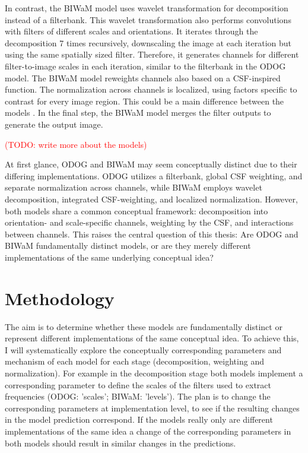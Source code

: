In contrast, the BIWaM model uses wavelet transformation for decomposition instead of a
filterbank. This wavelet transformation also performs convolutions with filters of
different scales and orientations. It iterates through the decomposition 7 times
recursively, downscaling the image at each iteration but using the same spatially sized
filter. Therefore, it generates channels for different filter-to-image scales in each
iteration, similar to the filterbank in the ODOG model. The BIWaM model reweights channels
also based on a CSF-inspired function. The normalization across channels is localized,
using factors specific to contrast for every image region. This could be a main difference
between the models \parencite{Betz2015}. In the final step, the BIWaM model merges the
filter outputs to generate the output image.

\textcolor{red}{(TODO: write more about the models)}


At first glance, ODOG and BIWaM may seem conceptually distinct due to their differing
implementations. ODOG utilizes a filterbank, global CSF weighting, and separate
normalization across channels, while BIWaM employs wavelet decomposition, integrated
CSF-weighting, and localized normalization. However, both models share
a common conceptual framework: decomposition into orientation- and scale-specific
channels, weighting by the CSF, and interactions between channels. This raises the central
question of this thesis: Are ODOG and BIWaM fundamentally distinct models, or are they
merely different implementations of the same underlying conceptual idea? 


\newpage


\section{Methodology}

The aim is to determine whether these models are fundamentally distinct or represent
different implementations of the same conceptual idea. To achieve this, I will
systematically explore the conceptually corresponding parameters and mechanism of each
model for each stage (decomposition, weighting and normalization). For example in the
decomposition stage both models implement a corresponding parameter to define the scales
of the filters used to extract frequencies (ODOG: 'scales'; BIWaM: 'levels'). The plan is to
change the corresponding parameters at implementation level, to see if the resulting
changes in the model prediction correspond. If the models really only are different
implementations of the same idea a change of the corresponding parameters in both models
should result in similar changes in the predictions.

